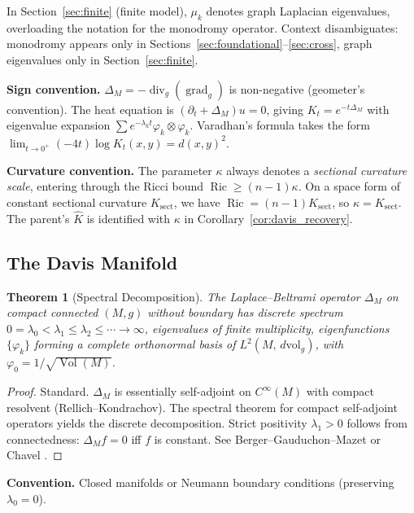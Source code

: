 \documentclass[11pt]{article}
\newtheorem{theorem}{Theorem}[section]
\theoremstyle{definition}
\theoremstyle{remark}
\newcommand{\Ric}{\operatorname{Ric}}
\newcommand{\Vol}{\operatorname{Vol}}
\newcommand{\dvol}{\,d\mathrm{vol}}
\begin{document}
In Section~\ref{sec:finite} (finite model), $\mu_k$ denotes graph Laplacian eigenvalues, overloading the notation for the monodromy operator. Context disambiguates: monodromy appears only in Sections~\ref{sec:foundational}--\ref{sec:cross}, graph eigenvalues only in Section~\ref{sec:finite}.

\textbf{Sign convention.} $\Delta_M = -\operatorname{div}_g(\operatorname{grad}_g)$ is non-negative (geometer's convention). The heat equation is $(\partial_t + \Delta_M)u = 0$, giving $K_t = e^{-t\Delta_M}$ with eigenvalue expansion $\sum e^{-\lambda_k t}\varphi_k \otimes \varphi_k$. Varadhan's formula takes the form $\lim_{t \to 0^+}(-4t)\log K_t(x,y) = d(x,y)^2$.

\textbf{Curvature convention.} The parameter $\kappa$ always denotes a \emph{sectional curvature scale}, entering through the Ricci bound $\Ric \ge (n-1)\kappa$. On a space form of constant sectional curvature $K_{\mathrm{sect}}$, we have $\Ric = (n-1)K_{\mathrm{sect}}$, so $\kappa = K_{\mathrm{sect}}$. The parent's $\hat{K}$ is identified with $\kappa$ in Corollary~\ref{cor:davis_recovery}.

\subsection{The Davis Manifold}

\begin{theorem}[Spectral Decomposition]\label{thm:spectral}
The Laplace--Beltrami operator $\Delta_M$ on compact connected $(M,g)$ without boundary has discrete spectrum $0 = \lambda_0 < \lambda_1 \le \lambda_2 \le \cdots \to \infty$, eigenvalues of finite multiplicity, eigenfunctions $\{\varphi_k\}$ forming a complete orthonormal basis of $L^2(M, \dvol_g)$, with $\varphi_0 = 1/\sqrt{\Vol(M)}$.
\end{theorem}

\begin{proof}
Standard. $\Delta_M$ is essentially self-adjoint on $C^\infty(M)$ with compact resolvent (Rellich--Kondrachov). The spectral theorem for compact self-adjoint operators yields the discrete decomposition. Strict positivity $\lambda_1 > 0$ follows from connectedness: $\Delta_M f = 0$ iff $f$ is constant. See Berger--Gauduchon--Mazet \cite{BGM} or Chavel \cite{Chavel}.
\end{proof}

\textbf{Convention.} Closed manifolds or Neumann boundary conditions (preserving $\lambda_0 = 0$).
\end{document}
